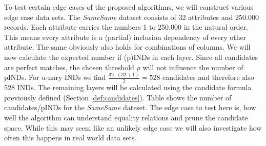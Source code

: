 To test certain edge cases of the proposed algorithms, we will construct various edge case data sets. The \textit{SameSame} dataset consists of 32 attributes and 250.000 records. Each attribute carries the numbers 1 to 250.000 in the natural order. This means every attribute is a (partial) inclusion dependency of every other attribute. The same obviously also holds for combinations of columns. We will now calculate the expected number if (p)INDs in each layer. Since all candidates are perfect matches, the chosen threshold $\rho$ will not influence the number of pINDs. For u-nary INDs we find $\frac{32 \cdot (32 + 1)}{2} = 528$ candidates and therefore also 528 INDs. The remaining layers will be calculated using the candidate formula previously defined (Section \ref{def:candidates}). Table %
shows the number of candidates/pINDs for the \textit{SameSame} dateset.
The edge case to test here is, how well the algorithm can understand equality relations and prune the candidate space. While this may seem like an unlikely edge case we will also investigate how often this happens in real world data sets.

